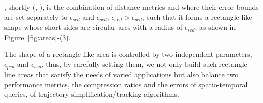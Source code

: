 , shortly \bed (\sed, \ped), is the combination of distance metrics \sed and \ped where their error bounds are set separately to $\epsilon_{sed}$ and $\epsilon_{ped}$, $\epsilon_{sed} > \epsilon_{ped}$, such that it forms a rectangle-like shape whose short sides are circular arcs with a radius of $\epsilon_{sed}$, as shown in {Figure~\ref{fig:areas}-(3)}. 

%
%


The shape of a rectangle-like area is controlled by two independent parameters, $\epsilon_{ped}$ and $\epsilon_{sed}$, thus, by carefully setting them, we not only build such rectangle-line areas that satisfy the needs of varied applications but also balance two performance metrics, the compression ratios and the errors of spatio-temporal queries, of trajectory simplification/tracking algorithms. 





